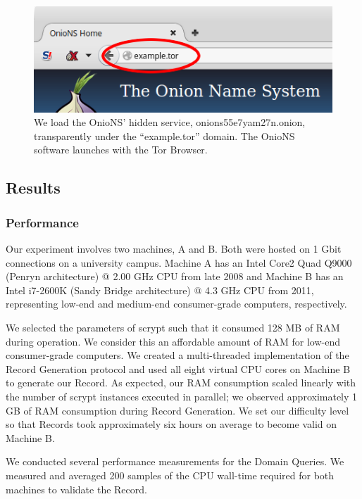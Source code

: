 \documentclass[conference]{IEEEtran}
\begin{document}
\begin{figure}[h]
	\centering
	\includegraphics[width=0.95\linewidth]{../assets/images/example.png}
	\caption{We load the OnioNS' hidden service, onions55e7yam27n.onion, transparently under the ``example.tor'' domain. The OnioNS software launches with the Tor Browser.}
	\label{fig:prototypeExample}
\end{figure}

\subsection{Results}

\subsubsection{Performance}

Our experiment involves two machines, A and B. Both were hosted on 1 Gbit connections on a university campus. Machine A has an Intel Core2 Quad Q9000 (Penryn architecture) @ 2.00 GHz CPU from late 2008 and Machine B has an Intel i7-2600K (Sandy Bridge architecture) @ 4.3 GHz CPU from 2011, representing low-end and medium-end consumer-grade computers, respectively.

We selected the parameters of scrypt such that it consumed 128 MB of RAM during operation. We consider this an affordable amount of RAM for low-end consumer-grade computers. We created a multi-threaded implementation of the Record Generation protocol and used all eight virtual CPU cores on Machine B to generate our Record. As expected, our RAM consumption scaled linearly with the number of scrypt instances executed in parallel; we observed approximately 1 GB of RAM consumption during Record Generation. We set our difficulty level so that Records took approximately six hours on average to become valid on Machine B.

We conducted several performance measurements for the Domain Queries.  We measured and averaged 200 samples of the CPU wall-time required for both machines to validate the Record.
\end{document}
